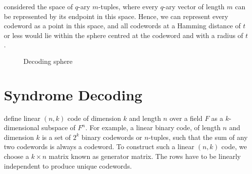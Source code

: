 \documentclass[../main.tex]{subfiles}
\begin{document}
    \autocite{bose2008information} considered the space of $q$-ary $m$-tuples, where every $q$-ary vector of length $m$ can be represented by its endpoint in this space. Hence, we can represent every codeword as a point in this space, and all codewords at a Hamming distance of $t$ or less would lie within the sphere centred at the codeword and with a radius of $t$.

    \begin{figure}[h!tp]
        \centering
        \caption{Decoding sphere}
        \label{fig:decoding_sphere}
    \end{figure}


    \section{Syndrome Decoding} \label{sec:syndrome_decoding}

    \autocite{trappe2006introduction} define linear $(n,k)$ code of dimension $k$ and length $n$ over a field $F$ as a $k$-dimensional subspace of $F^n$. For example, a linear binary code, of length $n$ and dimension $k$ is a set of $2^k$ binary codewords or $n$-tuples, such that the sum of any two codewords is always a codeword. To construct such a linear $(n,k)$ code, we choose a $k \times n$ matrix known as generator matrix. The rows have to be linearly independent to produce unique codewords.
\end{document}
